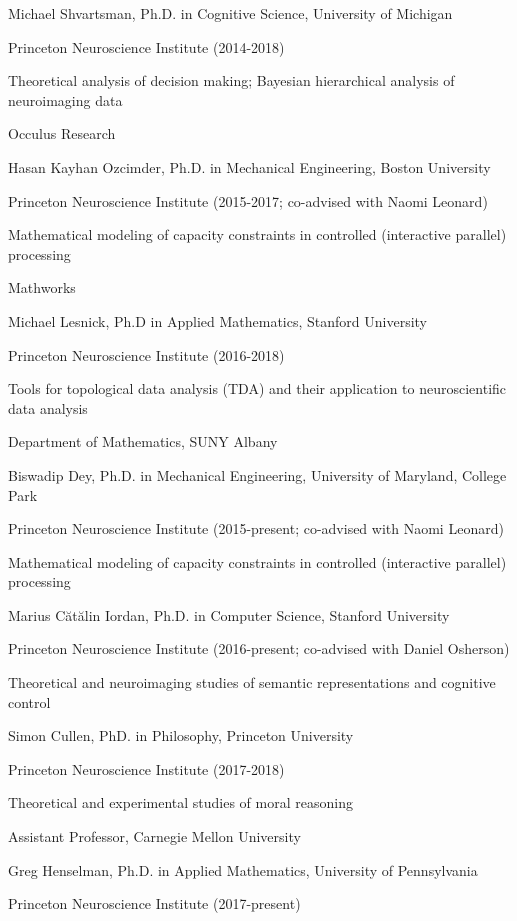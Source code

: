 \documentclass[10 pt]{article}
\begin{document}
Michael Shvartsman, Ph.D. in Cognitive Science, University of Michigan

Princeton Neuroscience Institute (2014-2018)

Theoretical analysis of decision making; Bayesian hierarchical analysis of neuroimaging data

Occulus Research
    \medskip

Hasan Kayhan Ozcimder, Ph.D. in Mechanical Engineering, Boston University

Princeton Neuroscience Institute (2015-2017; co-advised with Naomi Leonard)

Mathematical modeling of capacity constraints in controlled (interactive parallel) processing

Mathworks
    \medskip

Michael Lesnick, Ph.D in Applied Mathematics, Stanford University

Princeton Neuroscience Institute (2016-2018)

Tools for topological data analysis (TDA) and their application to neuroscientific data analysis

Department of Mathematics, SUNY Albany
    \medskip

Biswadip Dey, Ph.D. in Mechanical Engineering, University of Maryland, College Park

Princeton Neuroscience Institute (2015-present; co-advised with Naomi Leonard)

Mathematical modeling of capacity constraints in controlled (interactive parallel) processing
    \medskip

Marius Cătălin Iordan, Ph.D. in Computer Science, Stanford University

Princeton Neuroscience Institute (2016-present; co-advised with Daniel Osherson)

Theoretical and neuroimaging studies of semantic representations and cognitive control
    \medskip

Simon Cullen, PhD. in Philosophy, Princeton University

Princeton Neuroscience Institute (2017-2018)

Theoretical and experimental studies of moral reasoning

Assistant Professor, Carnegie Mellon University
    \medskip

Greg Henselman, Ph.D. in Applied Mathematics, University of Pennsylvania

Princeton Neuroscience Institute (2017-present)
\end{document}
